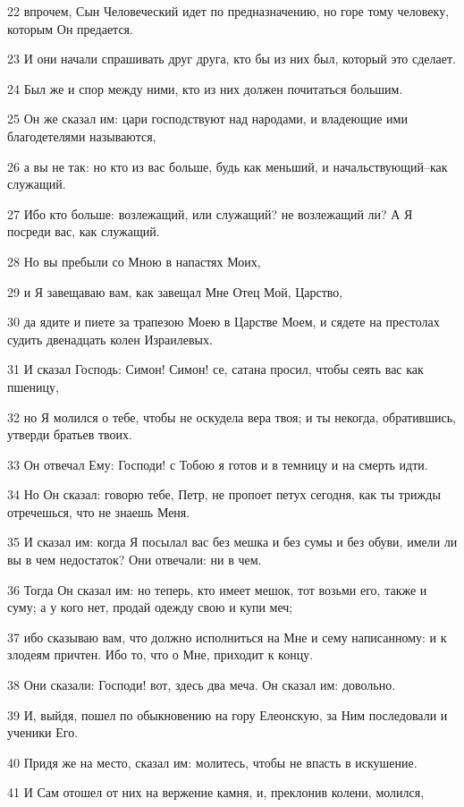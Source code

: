 \par 22 впрочем, Сын Человеческий идет по предназначению, но горе тому человеку, которым Он предается.
\par 23 И они начали спрашивать друг друга, кто бы из них был, который это сделает.
\par 24 Был же и спор между ними, кто из них должен почитаться большим.
\par 25 Он же сказал им: цари господствуют над народами, и владеющие ими благодетелями называются,
\par 26 а вы не так: но кто из вас больше, будь как меньший, и начальствующий--как служащий.
\par 27 Ибо кто больше: возлежащий, или служащий? не возлежащий ли? А Я посреди вас, как служащий.
\par 28 Но вы пребыли со Мною в напастях Моих,
\par 29 и Я завещаваю вам, как завещал Мне Отец Мой, Царство,
\par 30 да ядите и пиете за трапезою Моею в Царстве Моем, и сядете на престолах судить двенадцать колен Израилевых.
\par 31 И сказал Господь: Симон! Симон! се, сатана просил, чтобы сеять вас как пшеницу,
\par 32 но Я молился о тебе, чтобы не оскудела вера твоя; и ты некогда, обратившись, утверди братьев твоих.
\par 33 Он отвечал Ему: Господи! с Тобою я готов и в темницу и на смерть идти.
\par 34 Но Он сказал: говорю тебе, Петр, не пропоет петух сегодня, как ты трижды отречешься, что не знаешь Меня.
\par 35 И сказал им: когда Я посылал вас без мешка и без сумы и без обуви, имели ли вы в чем недостаток? Они отвечали: ни в чем.
\par 36 Тогда Он сказал им: но теперь, кто имеет мешок, тот возьми его, также и суму; а у кого нет, продай одежду свою и купи меч;
\par 37 ибо сказываю вам, что должно исполниться на Мне и сему написанному: и к злодеям причтен. Ибо то, что о Мне, приходит к концу.
\par 38 Они сказали: Господи! вот, здесь два меча. Он сказал им: довольно.
\par 39 И, выйдя, пошел по обыкновению на гору Елеонскую, за Ним последовали и ученики Его.
\par 40 Придя же на место, сказал им: молитесь, чтобы не впасть в искушение.
\par 41 И Сам отошел от них на вержение камня, и, преклонив колени, молился,
